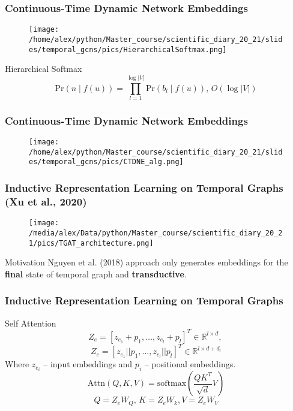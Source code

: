\documentclass[fleqn, xcolor=x11names]{beamer}
\begin{document}
\begin{frame}\frametitle{Continuous-Time Dynamic Network Embeddings}

\begin{figure}[h]
\begin{center}
\texttt{[image: /home/alex/python/Master\_course/scientific\_diary\_20\_21/slides/temporal\_gcns/pics/HierarchicalSoftmax.png]}
\end{center}
\end{figure}

\begin{block}{Hierarchical Softmax}
$$ \text{Pr} \left(n \mid f(u) \right)  =  \prod \limits_{l=1}^{\log |V|} \text{Pr}(b_l \mid f(u)),\, O(\log|V|) $$
\end{block}

\end{frame}

\begin{frame}\frametitle{Continuous-Time Dynamic Network Embeddings}
\begin{figure}[h]
\begin{center}
\texttt{[image: /home/alex/python/Master\_course/scientific\_diary\_20\_21/slides/temporal\_gcns/pics/CTDNE\_alg.png]}
\end{center}
\end{figure}
\end{frame}

\begin{frame}\frametitle{Inductive Representation Learning on Temporal Graphs\\
(Xu et al., 2020)}


\begin{figure}[h]
\begin{center}
\texttt{[image: /media/alex/Data/python/Master\_course/scientific\_diary\_20\_21/pics/TGAT\_architecture.png]}
\end{center}
\end{figure}

\begin{block}{Motivation}
Nguyen et al. (2018) approach only generates
embeddings for the \textbf{final} state of temporal graph and \textbf{transductive}.
\end{block}

\end{frame}

\begin{frame}\frametitle{Inductive Representation Learning on Temporal Graphs}

\begin{block}{Self Attention}
$$ Z_e = \left[ z_{e_1} + p_1, \dots, z_{e_l} + p_l \right]^T \in \mathbb{R}^{l \times d}, \,$$
$$ Z_e = \left[ z_{e_1} || p_1, \dots, z_{e_l} || p_l \right]^T \in \mathbb{R}^{l \times d+d_l}$$
Where $z_{e_i}$ -- input embeddings and $p_i$ -- positional embeddings.
$$ \text{Attn}(Q, K, V) = \text{softmax}\left( \frac{QK^T}{\sqrt{d}}V \right)$$
$$Q = Z_e W_Q,\, K = Z_e W_k, V = Z_e W_V$$
\end{block}

\end{frame}
\end{document}
